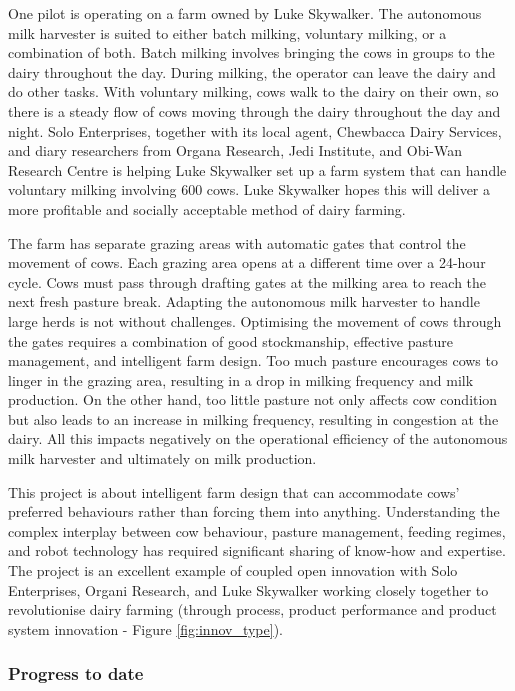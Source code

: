One pilot is operating on a farm owned by Luke Skywalker. The autonomous milk harvester is suited to either batch milking, voluntary milking, or a combination of both. Batch milking involves bringing the cows in groups to the dairy throughout the day. During milking, the operator can leave the dairy and do other tasks. With voluntary milking, cows walk to the dairy on their own, so there is a steady flow of cows moving through the dairy throughout the day and night. Solo Enterprises, together with its local agent, Chewbacca Dairy Services, and diary researchers from  Organa Research, Jedi Institute, and Obi-Wan Research Centre is helping Luke Skywalker set up a farm system that can handle voluntary milking involving 600 cows. Luke Skywalker hopes this will deliver a more profitable and socially acceptable method of dairy farming.  \medskip

The farm has separate grazing areas with automatic gates that control the movement of cows. Each grazing area opens at a different time over a 24-hour cycle. Cows must pass through drafting gates at the milking area to reach the next fresh pasture break. Adapting the autonomous milk harvester to handle large herds is not without challenges. Optimising the movement of cows through the gates requires a combination of good stockmanship, effective pasture management, and intelligent farm design. Too much pasture encourages cows to linger in the grazing area, resulting in a drop in milking frequency and milk production. On the other hand, too little pasture not only affects cow condition but also leads to an increase in milking frequency, resulting in congestion at the dairy. All this impacts negatively on the operational efficiency of the autonomous milk harvester and ultimately on milk production. 

This project is about intelligent farm design that can accommodate cows' preferred behaviours rather than forcing them into anything. Understanding the complex interplay between cow behaviour, pasture management, feeding regimes, and robot technology has required significant sharing of know-how and expertise. The project is an excellent example of coupled open innovation with Solo Enterprises, Organi Research, and Luke Skywalker working closely together to revolutionise dairy farming (through process, product performance and product system innovation - Figure \ref{fig:innov_type}).  

\subsubsection{Progress to date}

